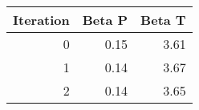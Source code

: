 \begin{tabular}{rrr}
\toprule
 Iteration &  Beta P &  Beta T \\
\midrule
         0 &    0.15 &    3.61 \\
         1 &    0.14 &    3.67 \\
         2 &    0.14 &    3.65 \\
\bottomrule
\end{tabular}
